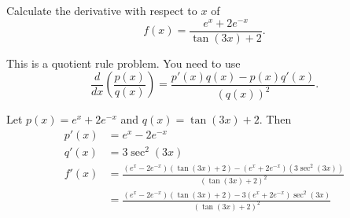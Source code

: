 \documentclass{ximera}
\author{Emma Smith Zbarsky}
\begin{document}
\begin{exercise}

Calculate the derivative with respect to $x$ of
\[f(x) = \frac{e^{x}+2e^{-x}}{\tan(3x)+2}.\]


\begin{hint}
This is a quotient rule problem. You need to use
\[\frac{d}{dx}\left(\frac{p(x)}{q(x)}\right) = \frac{p'(x)q(x)-p(x)q'(x)}{(q(x))^2}.\]
\end{hint}


\begin{hint}
Let $p(x) = e^x+2e^{-x}$ and $q(x) = \tan(3x)+2$. Then \begin{align*}
p'(x) &= e^x-2e^{-x} \\
q'(x) &= 3\sec^2(3x) \\
f'(x) &= \frac{\left(e^x-2e^{-x}\right)\left(\tan(3x)+2\right) - \left(e^x+2e^{-x}\right)\left(3\sec^2(3x)\right)}{\left(\tan(3x)+2\right)^2} \\
&= \frac{\left(e^x-2e^{-x}\right)\left(\tan(3x)+2\right) - 3\left(e^x+2e^{-x}\right)\sec^2(3x)}{\left(\tan(3x)+2\right)^2}
\end{align*}
\end{hint}


\begin{multipleChoice}
\end{multipleChoice}

\end{exercise}
\end{document}
